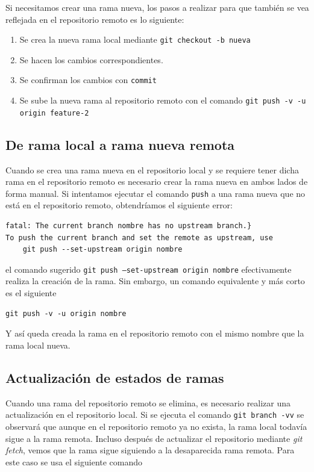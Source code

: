 Si necesitamos crear una rama nueva, los pasos a realizar para que también se vea reflejada en el repositorio remoto es lo siguiente:

\begin{enumerate}
    \item Se crea la nueva rama local mediante \texttt{git checkout -b nueva}
    \item Se hacen los cambios correspondientes.
    \item Se confirman los cambios con \texttt{commit}
    \item Se sube la nueva rama al repositorio remoto con el comando \texttt{git push -v -u origin feature-2}
\end{enumerate}

\subsection{De rama local a rama nueva remota}

Cuando se crea una rama nueva en el repositorio local y se requiere tener dicha rama en el repositorio remoto es necesario crear la rama nueva en ambos lados de forma manual. Si intentamos ejecutar el comando \texttt{push} a una rama nueva que no está en el repositorio remoto, obtendríamos el siguiente error:

\begin{verbatim}
fatal: The current branch nombre has no upstream branch.}
To push the current branch and set the remote as upstream, use
    git push --set-upstream origin nombre
\end{verbatim}

el comando sugerido \texttt{git push --set-upstream origin nombre} efectivamente realiza la creación de la rama. Sin embargo, un comando equivalente y más corto es el siguiente

\begin{verbatim}
git push -v -u origin nombre
\end{verbatim}

Y así queda creada la rama en el repositorio remoto con el mismo nombre que la rama local nueva. 


\subsection{Actualización de estados de ramas}

Cuando una rama del repositorio remoto se elimina, es necesario realizar una actualización en el repositorio local. Si se ejecuta el comando \texttt{git branch -vv} se observará que aunque en el repositorio remoto ya no exista, la rama local todavía sigue a la rama remota. Incluso después de actualizar el repositorio mediante \textit{git fetch}, vemos que la rama sigue siguiendo a la desaparecida rama remota. 
Para este caso se usa el siguiente comando

